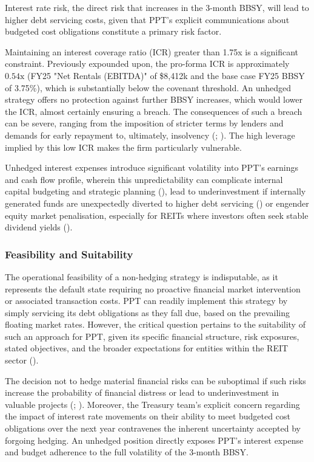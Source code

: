 \documentclass[11pt, a4paper, british]{article}
\begin{document}
Interest rate risk, the direct risk that increases in the 3-month BBSY, will lead to higher debt servicing costs, given that PPT's explicit communications about budgeted cost obligations constitute a primary risk factor.

Maintaining an interest coverage ratio (ICR) greater than 1.75x is a significant constraint. Previously expounded upon, the pro-forma ICR is approximately $0.54 \text{x}$ (FY25 "Net Rentals (EBITDA)" of \$8,412k and the base case FY25 BBSY of 3.75\%), which is substantially below the covenant threshold. An unhedged strategy offers no protection against further BBSY increases, which would lower the ICR, almost certainly ensuring a breach. The consequences of such a breach can be severe, ranging from the imposition of stricter terms by lenders and demands for early repayment to, ultimately, insolvency (\cite{ss}; \cite{tw}). The high leverage implied by this low ICR makes the firm particularly vulnerable.

Unhedged interest expenses introduce significant volatility into PPT's earnings and cash flow profile, wherein this unpredictability can complicate internal capital budgeting and strategic planning (\cite{fss}), lead to underinvestment if internally generated funds are unexpectedly diverted to higher debt servicing (\cite{ms}) or engender equity market penalisation, especially for REITs where investors often seek stable dividend yields (\cite{ons}).


\subsubsection{Feasibility and Suitability}
The operational feasibility of a non-hedging strategy is indisputable, as it represents the default state requiring no proactive financial market intervention or associated transaction costs. PPT can readily implement this strategy by simply servicing its debt obligations as they fall due, based on the prevailing floating market rates. However, the critical question pertains to the suitability of such an approach for PPT, given its specific financial structure, risk exposures, stated objectives, and the broader expectations for entities within the REIT sector (\cite{mw}).

The decision not to hedge material financial risks can be suboptimal if such risks increase the probability of financial distress or lead to underinvestment in valuable projects (\cite{fss}; \cite{ss}). Moreover, the Treasury team's explicit concern regarding the impact of interest rate movements on their ability to meet budgeted cost obligations over the next year contravenes the inherent uncertainty accepted by forgoing hedging. An unhedged position directly exposes PPT's interest expense and budget adherence to the full volatility of the 3-month BBSY.
\end{document}
